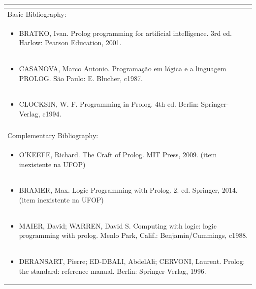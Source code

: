 \documentclass[11pt]{article}
\begin{document}
\begin{center}
\begin{longtable}{|p{4cm}|p{4cm}|p{4cm}|p{4cm}|}
\multicolumn{4}{|p{\dimexpr 16cm + 6\tabcolsep\relax}|}{}\\
\hline
\multicolumn{4}{|p{16cm}|}{Basic Bibliography:}\\*
\multicolumn{4}{|p{\dimexpr 16cm + 6\tabcolsep\relax}|}{\begin{itemize}\item BRATKO, Ivan. Prolog programming for artificial intelligence. 3rd ed. Harlow: Pearson Education, 2001.\end{itemize}}\\
\multicolumn{4}{|p{\dimexpr 16cm + 6\tabcolsep\relax}|}{\begin{itemize}\item CASANOVA, Marco Antonio. Programação em lógica e a linguagem PROLOG. São Paulo: E. Blucher, c1987.\end{itemize}}\\
\multicolumn{4}{|p{\dimexpr 16cm + 6\tabcolsep\relax}|}{\begin{itemize}\item CLOCKSIN, W. F. Programming in Prolog. 4th ed. Berlin: Springer-Verlag, c1994.\end{itemize}}\\
\multicolumn{4}{|p{16cm}|}{}\\
\hline
\multicolumn{4}{|p{16cm}|}{Complementary Bibliography:}\\*
\multicolumn{4}{|p{\dimexpr 16cm + 6\tabcolsep\relax}|}{\begin{itemize}\item O'KEEFE, Richard. The Craft of Prolog. MIT Press, 2009. (item inexistente na UFOP)\end{itemize}}\\
\multicolumn{4}{|p{\dimexpr 16cm + 6\tabcolsep\relax}|}{\begin{itemize}\item BRAMER, Max. Logic Programming with Prolog. 2. ed. Springer, 2014. (item inexistente na UFOP)\end{itemize}}\\
\multicolumn{4}{|p{\dimexpr 16cm + 6\tabcolsep\relax}|}{\begin{itemize}\item MAIER, David; WARREN, David S. Computing with logic: logic programming with prolog. Menlo Park, Calif.: Benjamin/Cummings, c1988.\end{itemize}}\\
\multicolumn{4}{|p{\dimexpr 16cm + 6\tabcolsep\relax}|}{\begin{itemize}\item DERANSART, Pierre; ED-DBALI, AbdelAli; CERVONI, Laurent. Prolog: the standard: reference manual. Berlin: Springer-Verlag, 1996.\end{itemize}}\\

\end{longtable}
\end{center}
\end{document}
